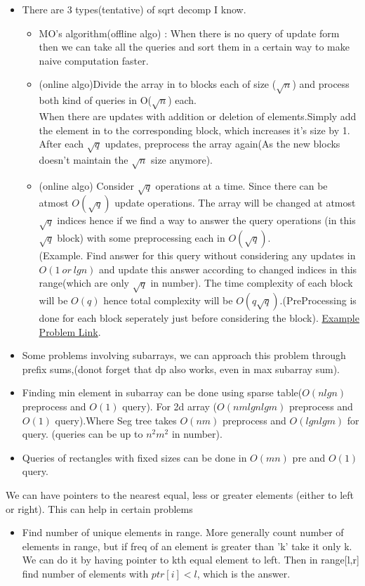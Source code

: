 \documentclass[../Notes.tex]{subfiles}
\begin{document}
\begin{itemize}
	\item There are 3 types(tentative) of sqrt decomp I know.
	\begin{itemize}
		\item MO's algorithm(offline algo) : When there is no query of update form then we can take all the queries and sort them in a certain way to make naive computation faster.
		\item (online algo)Divide the array in to blocks each of size ($\sqrt{n}$) and process both kind of queries in O($\sqrt{n}$) each.\\
		When there are updates with addition or deletion of elements.Simply add the element in to the corresponding block, which increases it's size by 1. After each $\sqrt{q}$ updates, preprocess the array again(As the new blocks doesn't maintain the $\sqrt{n}$ size anymore).
		\item (online algo) Consider $\sqrt{q}$ operations at a time. Since there can be atmost $O(\sqrt{q})$ update operations. The array will be changed at atmost $\sqrt{q}$ indices hence if we find a way to answer the query operations (in this $\sqrt{q}$ block) with some preprocessing each in $O(\sqrt{q})$.\\
		 (Example. Find answer for this query without considering any updates in $O(1 \: or \: lgn)$ and update this answer according to changed indices in this range(which are only $\sqrt{q}$ in number). The time complexity of each block will be $O(q)$ hence total complexity will be $O(q\sqrt{q})$.(PreProcessing is done for each block seperately just before considering the block). \href{https://codeforces.com/problemset/problem/785/E}{Example Problem Link}.
	\end{itemize}
	\item Some problems involving subarrays, we can approach this problem through prefix sums,(donot forget that dp also works, even in max subarray sum). 
	\item Finding min element in subarray can be done using sparse table($O(nlgn)$ preprocess and $O(1)$ query). For 2d array ($O(nmlgnlgm)$ preprocess and $O(1)$ query).Where Seg tree takes $O(nm)$ preprocess and $O(lgnlgm)$ for query. (queries can be up to $n^2m^2$ in number).
	\item Queries of rectangles with fixed sizes can be done in $O(mn)$ pre and $O(1)$ query.
\end{itemize}

We can have pointers to the nearest equal, less or greater elements (either to left or right). This can help in certain problems
\begin{itemize}
	\item Find number of unique elements in range. More generally count number of elements in range, but if freq of an element is greater than 'k' take it only k.\\
	We can do it by having pointer to kth equal element to left. Then in range[l,r] find number of elements with $ptr[i]<l$, which is the answer.
\end{itemize}
\end{document}
